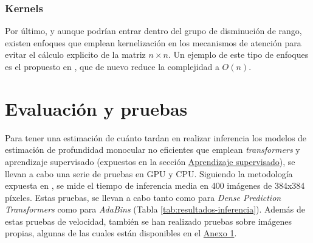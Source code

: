 \documentclass[a4paper, 11pt]{article}
\begin{document}
\subsubsection{Kernels}
Por último, y aunque podrían entrar dentro del grupo de disminución de rango, existen enfoques que emplean kernelización en los mecanismos de atención para evitar el cálculo explicito de la matriz $n \times n$. Un ejemplo de este tipo de enfoques es el propuesto en \cite{kernel-transformer}, que de nuevo reduce la complejidad a $O(n)$.


\clearpage
\section{Evaluación y pruebas}\label{resultados}

Para tener una estimación de cuánto tardan en realizar inferencia los modelos de estimación de profundidad monocular no eficientes que emplean \textit{transformers} y aprendizaje supervisado (expuestos en la sección \hyperref[aprendizaje-supervisado]{Aprendizaje supervisado}), se llevan a cabo una serie de pruebas en GPU y CPU. Siguiendo la metodología expuesta en \cite{visiontransformersDPT}, se mide el tiempo de inferencia media en 400 imágenes de 384x384 píxeles. Estas pruebas, se llevan a cabo tanto como para \textit{Dense Prediction Transformers} como para \textit{AdaBins} (Tabla \ref{tab:resultados-inferencia}). Además de estas pruebas de velocidad, también se han realizado pruebas sobre imágenes propias, algunas de las cuales están disponibles en el \hyperref[anexo1]{Anexo 1}. 
\end{document}
